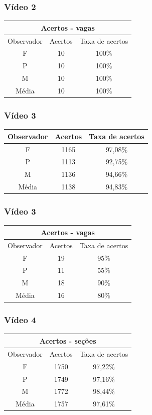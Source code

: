 \documentclass{beamer}
\begin{document}
\begin{frame}
\frametitle{Vídeo 2}
\begin{center}
\begin{tabular}{|c||c||c|}
\hline
\multicolumn{3}{|c|}{Acertos - vagas}  \\ \hline \hline
Observador & Acertos & Taxa de acertos \\ \hline
F & 10 & 100\% \\  \hline
P & 10 & 100\% \\ \hline
M & 10 & 100\% \\ \hline
Média & 10 & 100\% \\
\hline
\end{tabular}
\end{center}
\end{frame}


\begin{frame}
	\frametitle{Vídeo 3}
\begin{center}
\begin{tabular}{|c||c||c|}
\hline
Observador & Acertos & Taxa de acertos \\ \hline
F & 1165 & 97,08\% \\  \hline
P & 1113 & 92,75\% \\ \hline
M & 1136 & 94,66\% \\ \hline
Média & 1138 & 94,83\% \\
\hline
\end{tabular}
\end{center}
\end{frame}

\begin{frame}
\frametitle{Vídeo 3}
\begin{center}
\begin{tabular}{|c||c||c|}
\hline
\multicolumn{3}{|c|}{Acertos - vagas}  \\ \hline \hline
Observador & Acertos & Taxa de acertos \\ \hline
F & 19 & 95\% \\  \hline
P & 11 & 55\% \\ \hline
M & 18 & 90\% \\ \hline
Média & 16 & 80\% \\
\hline
\end{tabular}
\end{center}
\end{frame}



\begin{frame}
	\frametitle{Vídeo 4}
\begin{center}
\begin{tabular}{|c||c||c|}
\hline
\multicolumn{3}{|c|}{Acertos - seções}  \\ \hline \hline
Observador & Acertos & Taxa de acertos \\ \hline
F & 1750 & 97,22\% \\  \hline
P & 1749 & 97,16\% \\ \hline
M & 1772 & 98,44\% \\ \hline
Média & 1757 & 97,61\% \\
\hline
\end{tabular}
\end{center}
\end{frame}
\end{document}
